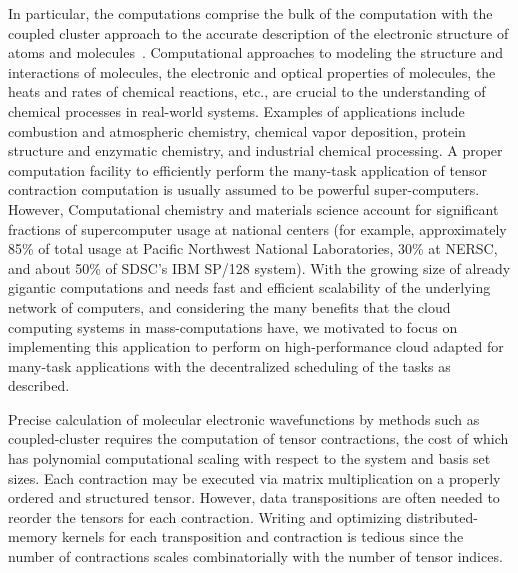\documentclass{sig-alternate}
\begin{document}
In particular, the computations comprise the bulk
of the computation with the coupled cluster approach to the accurate description of the electronic structure of atoms and molecules~\cite{martin:encyclopedia,lee:achieving}. Computational approaches to modeling the structure and interactions of molecules, the electronic and optical properties of molecules, the heats and rates of chemical reactions, etc., are crucial to the understanding of chemical processes in real-world systems. Examples of applications include combustion and atmospheric chemistry, chemical vapor deposition, protein structure and enzymatic chemistry, and industrial chemical processing. A proper computation facility to efficiently perform the many-task application of tensor contraction computation is usually assumed to be powerful super-computers. However, Computational chemistry and materials science account for significant fractions of supercomputer usage at national centers (for example, approximately 85\% of total usage at Pacific Northwest National Laboratories, 30\% at NERSC, and about 50\% of SDSC's IBM SP/128 system). With the growing size of already gigantic computations and needs fast and efficient scalability of the underlying network of computers, and considering the many benefits that the cloud computing systems in mass-computations have, we motivated to focus on implementing this application to perform on high-performance cloud adapted for many-task applications with the decentralized scheduling of the tasks as described.


Precise calculation of molecular electronic wavefunctions by methods such as coupled-cluster requires
the computation of tensor contractions, the cost of which has polynomial computational scaling
with respect to the system and basis set sizes. Each contraction may be executed via matrix multiplication
on a properly ordered and structured tensor. However, data transpositions are often needed to
reorder the tensors for each contraction. Writing and optimizing distributed-memory kernels for each
transposition and contraction is tedious since the number of contractions scales combinatorially with the
number of tensor indices.
\end{document}
